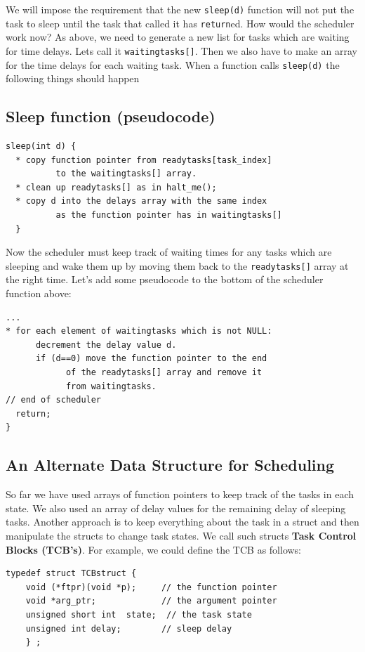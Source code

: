\documentclass{article}	%
\begin{document}
We will impose the requirement that the new {\tt sleep(d)} function will not put the task to sleep until the task that called it has {\tt return}ed.    How would the scheduler work now?
As above, we need to generate a new list for tasks which are waiting for time delays.   Lets call it {\tt waitingtasks[]}.   Then we also have to make an array for 
the time delays for each waiting task.    When a function calls {\tt sleep(d)} the following things should happen


\subsection*{Sleep function (pseudocode)}
\begin{verbatim}
sleep(int d) {
  * copy function pointer from readytasks[task_index] 
          to the waitingtasks[] array. 
  * clean up readytasks[] as in halt_me();
  * copy d into the delays array with the same index 
          as the function pointer has in waitingtasks[]
  }
\end{verbatim}

Now the scheduler must keep track of waiting times for any tasks which are sleeping and  wake them up  by moving them back to the {\tt readytasks[]} array at the right time.
Let's add some pseudocode to the bottom of the scheduler function above:

\begin{verbatim}
...
* for each element of waitingtasks which is not NULL:
      decrement the delay value d.
      if (d==0) move the function pointer to the end
            of the readytasks[] array and remove it 
            from waitingtasks.
// end of scheduler
  return;
}
\end{verbatim}
 


\subsection{An Alternate Data Structure for Scheduling}
So far we have used arrays of function pointers to keep track of the tasks in each state.  We also used an array of delay values for the remaining delay of sleeping tasks.   Another approach is to keep everything about the task in a struct and then manipulate the structs to change task states.  We call such structs {\bf Task Control Blocks (TCB's)}.   For example, we could define the TCB as follows:
\begin{verbatim}
typedef struct TCBstruct {
    void (*ftpr)(void *p);     // the function pointer
    void *arg_ptr;             // the argument pointer
    unsigned short int  state;  // the task state
    unsigned int delay;        // sleep delay
    } ;
\end{verbatim}
\end{document}

